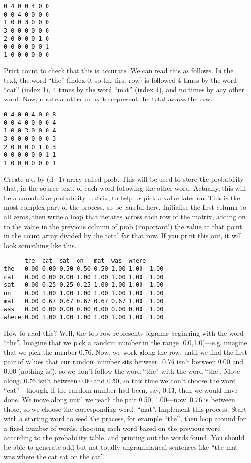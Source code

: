 \documentclass[11pt]{article}
\begin{document}
\begin{verbatim}
0 4 0 0 4 0 0
0 0 4 0 0 0 0
1 0 0 3 0 0 0
3 0 0 0 0 0 0
2 0 0 0 0 1 0
0 0 0 0 0 0 1
1 0 0 0 0 0 0
\end{verbatim}

Print count to check that this is accurate. We can read this as follows. In the text, the word “the” (index 0, so the first row) is followed 4 times by the word “cat” (index 1), 4 times by the word “mat” (index 4), and no times by any other word. Now, create another array to represent the total across the row:

\begin{verbatim}
0 4 0 0 4 0 0 8
0 0 4 0 0 0 0 4
1 0 0 3 0 0 0 4
3 0 0 0 0 0 0 3
2 0 0 0 0 1 0 3
0 0 0 0 0 0 1 1
1 0 0 0 0 0 0 1
\end{verbatim}

Create a d-by-(d+1) array called prob. This will be used to store the probability
that, in the source text, of each word following the other word. Actually, this
will be a cumulative probability matrix, to help us pick a value later on. This
is the most complex part of the process, so be careful here. 
Initialise the first column to all zeros, then write a loop that iterates across each row of the matrix, adding on to the value in the previous column of prob (important!) the value at that point in the count array divided by the total for that row. If you print this out, it will look something like this.

\begin{verbatim}
      the  cat  sat  on   mat  was  where
the   0.00 0.00 0.50 0.50 0.50 1.00 1.00  1.00
cat   0.00 0.00 0.00 1.00 1.00 1.00 1.00  1.00
sat   0.00 0.25 0.25 0.25 1.00 1.00 1.00  1.00
on    0.00 1.00 1.00 1.00 1.00 1.00 1.00  1.00
mat   0.00 0.67 0.67 0.67 0.67 0.67 1.00  1.00
was   0.00 0.00 0.00 0.00 0.00 0.00 0.00  1.00
where 0.00 1.00 1.00 1.00 1.00 1.00 1.00  1.00
\end{verbatim}

How to read this? Well, the top row represents bigrams beginning with the word “the”.
Imagine that we pick a random number in the range [0.0,1.0)—e.g. imagine that we pick the number 0.76. Now, we work along the row, until we find the first pair of values that our random number sits between. 0.76 isn’t between 0.00 and 0.00 (nothing is!), so we don’t follow the word “the” with the word “the”. Move along. 0.76 isn’t between 0.00 and 0.50, so this time we don’t choose the word “cat”—though, if the random number had been, say, 0.13, then we would have done. We move along until we reach the pair 0.50, 1.00—now, 0.76 is between those, so we choose the corresponding word: “mat”.
Implement this process. 
Start with a starting word to seed the process, for example “the”, then loop
around for a fixed number of words, choosing each word based on the previous
word according to the probability table, and printing out the words found.
You should be able to generate odd but not totally ungrammatical sentences like “the mat was where the cat sat on the cat”.
\end{document}
